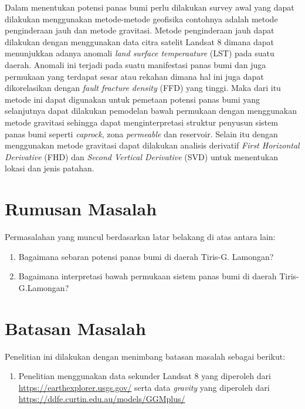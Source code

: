 \hspace{25pt}Dalam menentukan potensi panas bumi perlu dilakukan survey awal yang dapat dilakukan menggunakan metode-metode geofisika contohnya adalah metode penginderaan jauh dan metode gravitasi. Metode penginderaan jauh dapat dilakukan dengan menggunakan data citra satelit Landsat 8 dimana dapat menunjukkan adanya anomali \textit{land surface temperaature} (LST) pada suatu daerah. Anomali ini terjadi pada suatu manifestasi panas bumi dan juga permukaan yang terdapat sesar atau rekahan dimana hal ini juga dapat dikorelasikan dengan \textit{fault fracture density} (FFD) yang tinggi. Maka dari itu metode ini dapat digunakan untuk pemetaan potensi panas bumi yang selanjutnya dapat dilakukan pemodelan bawah permukaan dengan menggunakan metode gravitasi sehingga dapat menginterpretasi struktur penyusun sistem panas bumi seperti \textit{caprock}, zona \textit{permeable} dan reservoir. Selain itu dengan menggunakan metode gravitasi dapat dilakukan analisis derivatif \textit{First Horizontal Derivative }(FHD) dan \textit{Second Vertical Derivative }(SVD) untuk menentukan lokasi dan jenis patahan.


\section{Rumusan Masalah}
\hspace{22pt} Permasalahan yang muncul berdasarkan latar belakang di atas antara lain:
\begin{enumerate}
    \item Bagaimana sebaran potensi panas bumi di daerah Tiris-G. Lamongan?
    \item Bagaimana interpretasi bawah permukaan sistem panas bumi di daerah Tiris-G.Lamongan?\sloppy
    
\end{enumerate}


\section{Batasan Masalah}
\hspace{22pt}Penelitian ini dilakukan dengan menimbang batasan masalah sebagai berikut:
\begin{enumerate}
    \item Penelitian menggunakan data sekunder Landsat 8 yang diperoleh dari \href{https://earthexplorer.usgs.gov/}{https://earthexplorer.usgs.gov/} serta data \textit{gravity} yang diperoleh dari \href{https://ddfe.curtin.edu.au/models/GGMplus/}{https://ddfe.curtin.edu.au/models/GGMplus/}\sloppy
\end{enumerate}


